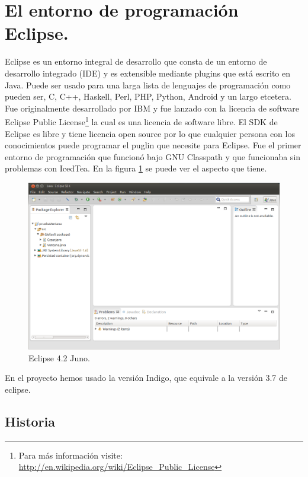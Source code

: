 \section{El entorno de programación Eclipse.}

Eclipse es un entorno integral de desarrollo que consta de un entorno de desarrollo integrado (IDE) y es extensible mediante plugins que está escrito en Java. Puede ser usado para una larga lista de lenguajes de programación como pueden ser,  C, C++, Haskell, Perl, PHP, Python, Android y un largo etcetera. Fue originalmente desarrollado por IBM y fue lanzado con la licencia de software Eclipse Public License\footnote{Para más información visite: \url{http://en.wikipedia.org/wiki/Eclipse\_Public\_License}} la cual es una licencia de software libre. El SDK de Eclipse es libre y tiene licencia open source por lo que cualquier persona con los conocimientos puede programar el puglin que necesite para Eclipse. Fue el primer entorno de programación que funcionó bajo GNU Classpath y que funcionaba sin problemas con IcedTea. En la figura \ref{fig:pantallaEclipse} se puede ver el aspecto que tiene.

\begin{figure}
  \centering
    \includegraphics[scale=0.5]{./ConocimientosPrevios/imagenes/pantallaEclipse.png}
  \caption{Eclipse 4.2 Juno.}
  \label{fig:pantallaEclipse}
\end{figure} 

En el proyecto hemos usado la versión Indigo, que equivale a la versión 3.7 de eclipse.

\subsection{Historia}

